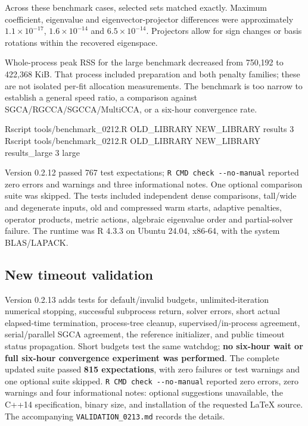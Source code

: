 \documentclass[
  11pt,
]{article}
\newenvironment{Shaded}{}{}
\newcommand{\ExtensionTok}[1]{#1}
\newcommand{\NormalTok}[1]{#1}
\begin{document}
Across these benchmark cases, selected sets matched exactly. Maximum
coefficient, eigenvalue and eigenvector-projector differences were
approximately \(1.1\times10^{-17}\), \(1.6\times10^{-14}\) and
\(6.5\times10^{-14}\). Projectors allow for sign changes or basis
rotations within the recovered eigenspace.

Whole-process peak RSS for the large benchmark decreased from 750,192 to
422,368 KiB. That process included preparation and both penalty
families; these are not isolated per-fit allocation measurements. The
benchmark is too narrow to establish a general speed ratio, a comparison
against SGCA/RGCCA/SGCCA/MultiCCA, or a six-hour convergence rate.

\begin{Shaded}
\begin{Highlighting}[]
\ExtensionTok{Rscript}\NormalTok{ tools/benchmark\_0212.R OLD\_LIBRARY NEW\_LIBRARY results 3}
\ExtensionTok{Rscript}\NormalTok{ tools/benchmark\_0212.R OLD\_LIBRARY NEW\_LIBRARY results\_large 3 large}
\end{Highlighting}
\end{Shaded}

Version 0.2.12 passed 767 test expectations;
\texttt{R\ CMD\ check\ -\/-no-manual} reported zero errors and warnings
and three informational notes. One optional comparison suite was
skipped. The tests included independent dense comparisons, tall/wide and
degenerate inputs, old and compressed warm starts, adaptive penalties,
operator products, metric actions, algebraic eigenvalue order and
partial-solver failure. The runtime was R 4.3.3 on Ubuntu 24.04, x86-64,
with the system BLAS/LAPACK.

\hypertarget{new-timeout-validation}{%
\subsection{New timeout validation}\label{new-timeout-validation}}

Version 0.2.13 adds tests for default/invalid budgets,
unlimited-iteration numerical stopping, successful subprocess return,
solver errors, short actual elapsed-time termination, process-tree
cleanup, supervised/in-process agreement, serial/parallel SGCA
agreement, the reference initializer, and public timeout status
propagation. Short budgets test the same watchdog; \textbf{no six-hour
wait or full six-hour convergence experiment was performed}. The
complete updated suite passed \textbf{815 expectations}, with zero
failures or test warnings and one optional suite skipped.
\texttt{R\ CMD\ check\ -\/-no-manual} reported zero errors, zero
warnings and four informational notes: optional suggestions unavailable,
the C++14 specification, binary size, and installation of the requested
LaTeX source. The accompanying \texttt{VALIDATION\_0213.md} records the
details.
\end{document}
